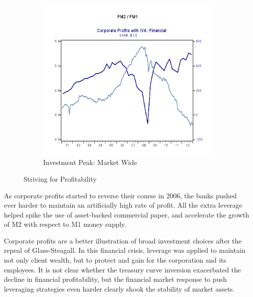 \begin{figure}[H]
\begin{subfigure}{.5\textwidth}
  \includegraphics[width=1.1\linewidth]{figure/M2Peak2.png}
  \caption{Investment Peak: Market Wide }
  \label{fig:M2Peak}
\end{subfigure}
\caption{Striving for Profitability}
\label{fig:NEW2}
\end{figure}

As corporate profits started to reverse their course in 2006, the banks pushed ever harder to maintain an artificially high rate of profit.  All the extra leverage helped spike the use of asset-backed commercial paper, and accelerate the growth of M2 with respect to M1 money supply.

Corporate profits are a better illustration of broad investment choices after the repeal of Glass-Steagall.  In this financial crisis, leverage was applied to maintain not only client wealth, but to protect and gain for the corporation and its employees.  It is not clear whether the treasury curve inversion exacerbated the decline in financial profitability, but the financial market response to push leveraging strategies even harder clearly shook the stability of market assets.




